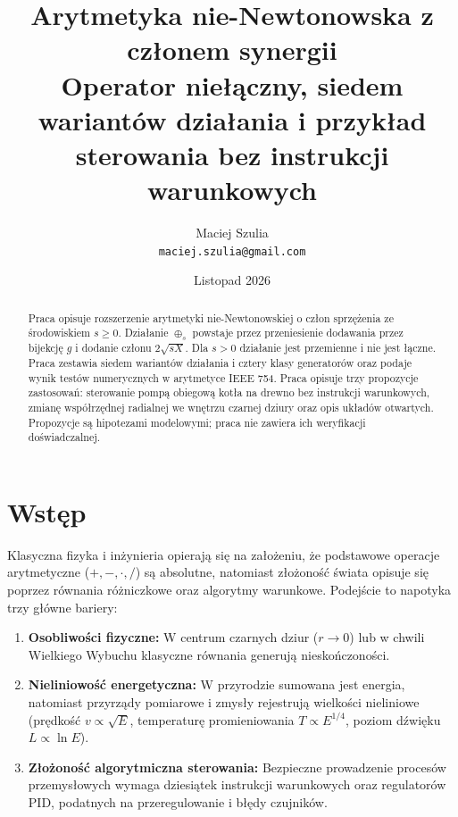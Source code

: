\documentclass[11pt,a4paper]{article}
\title{\textbf{Arytmetyka nie-Newtonowska z członem synergii}\\
\large Operator niełączny, siedem wariantów działania i przykład sterowania bez instrukcji warunkowych}
\author{Maciej Szulia\\[2pt]\normalsize\texttt{maciej.szulia@gmail.com}}
\date{Listopad 2026}
\theoremstyle{definition}
\theoremstyle{plain}
\begin{document}
\maketitle

\begin{abstract}
Praca opisuje rozszerzenie arytmetyki nie-Newtonowskiej o człon sprzężenia ze środowiskiem $s \ge 0$. Działanie $\oplus_s$ powstaje przez przeniesienie dodawania przez bijekcję $g$ i dodanie członu $2\sqrt{sX}$. Dla $s > 0$ działanie jest przemienne i nie jest łączne. Praca zestawia siedem wariantów działania i cztery klasy generatorów oraz podaje wynik testów numerycznych w arytmetyce IEEE 754. Praca opisuje trzy propozycje zastosowań: sterowanie pompą obiegową kotła na drewno bez instrukcji warunkowych, zmianę współrzędnej radialnej we wnętrzu czarnej dziury oraz opis układów otwartych. Propozycje są hipotezami modelowymi; praca nie zawiera ich weryfikacji doświadczalnej.
\end{abstract}

\tableofcontents
\newpage

\section{Wstęp}

Klasyczna fizyka i inżynieria opierają się na założeniu, że podstawowe operacje arytmetyczne ($+, -, \cdot, /$) są absolutne, natomiast złożoność świata opisuje się poprzez równania różniczkowe oraz algorytmy warunkowe. Podejście to napotyka trzy główne bariery:

\begin{enumerate}
    \item \textbf{Osobliwości fizyczne:} W centrum czarnych dziur ($r \to 0$) lub w chwili Wielkiego Wybuchu klasyczne równania generują nieskończoności.
    \item \textbf{Nieliniowość energetyczna:} W przyrodzie sumowana jest energia, natomiast przyrządy pomiarowe i zmysły rejestrują wielkości nieliniowe (prędkość $v \propto \sqrt{E}$, temperaturę promieniowania $T \propto E^{1/4}$, poziom dźwięku $L \propto \ln E$).
    \item \textbf{Złożoność algorytmiczna sterowania:} Bezpieczne prowadzenie procesów przemysłowych wymaga dziesiątek instrukcji warunkowych oraz regulatorów PID, podatnych na przeregulowanie i błędy czujników.
\end{enumerate}
\end{document}
